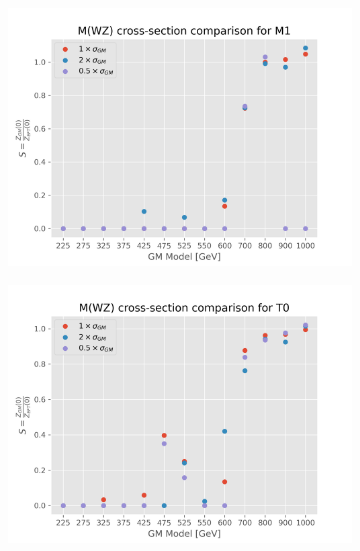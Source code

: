 \documentclass[../Bachelorarbeit.tex]{subfiles}
\begin{document}
\begin{figure}[h]
    \begin{subfigure}{0.45\textwidth}
        \includegraphics[width=\textwidth]{Plots/gm_relevanze/MWZ_comparision_M1.png}
        \caption{}
    \end{subfigure}
    \begin{subfigure}{0.45\textwidth}
        \includegraphics[width=\textwidth]{Plots/gm_relevanze/MWZ_comparision_T0.png}
        \caption{}
    \end{subfigure}
    \begin{subfigure}{0.45\textwidth}

\end{subfigure}
\end{figure}
\end{document}

